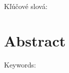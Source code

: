 

\medskip
\noindent
{\sc Kľúčové slová}: \mfkeywordssk
\fi
\ifx\draft\undefined

 \chapter*{Abstract}





\medskip
\noindent
{\sc Keywords}: \mfkeywords
\fi


\tableofcontents
\listoftables
\listoffigures
